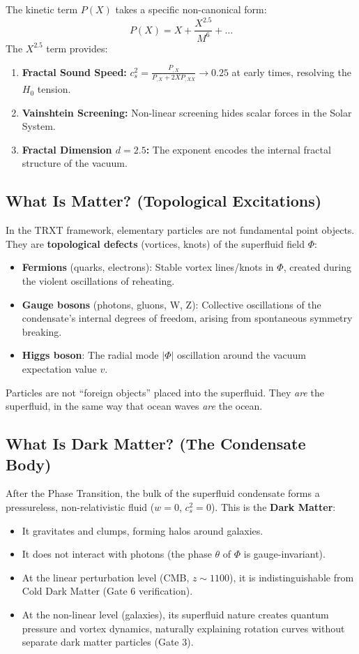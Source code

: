 \documentclass[a4paper,12pt]{article}
\begin{document}
The kinetic term $P(X)$ takes a specific non-canonical form:
\begin{equation}
    P(X) = X + \frac{X^{2.5}}{M^6} + \dots
\end{equation}
The $X^{2.5}$ term provides:
\begin{enumerate}
    \item \textbf{Fractal Sound Speed:} $c_s^2 = \frac{P_{,X}}{P_{,X} + 2X P_{,XX}} \to 0.25$ at early times, resolving the $H_0$ tension.
    \item \textbf{Vainshtein Screening:} Non-linear screening hides scalar forces in the Solar System.
    \item \textbf{Fractal Dimension $d = 2.5$:} The exponent encodes the internal fractal structure of the vacuum.
\end{enumerate}

\subsection{What Is Matter? (Topological Excitations)}
In the TRXT framework, elementary particles are not fundamental point objects. They are \textbf{topological defects} (vortices, knots) of the superfluid field $\Phi$:
\begin{itemize}
    \item \textbf{Fermions} (quarks, electrons): Stable vortex lines/knots in $\Phi$, created during the violent oscillations of reheating.
    \item \textbf{Gauge bosons} (photons, gluons, W, Z): Collective oscillations of the condensate's internal degrees of freedom, arising from spontaneous symmetry breaking.
    \item \textbf{Higgs boson}: The radial mode $|\Phi|$ oscillation around the vacuum expectation value $v$.
\end{itemize}
Particles are not ``foreign objects'' placed into the superfluid. They \textit{are} the superfluid, in the same way that ocean waves \textit{are} the ocean.

\subsection{What Is Dark Matter? (The Condensate Body)}
After the Phase Transition, the bulk of the superfluid condensate forms a pressureless, non-relativistic fluid ($w = 0$, $c_s^2 = 0$). This is the \textbf{Dark Matter}:
\begin{itemize}
    \item It gravitates and clumps, forming halos around galaxies.
    \item It does not interact with photons (the phase $\theta$ of $\Phi$ is gauge-invariant).
    \item At the linear perturbation level (CMB, $z \sim 1100$), it is indistinguishable from Cold Dark Matter (Gate 6 verification).
    \item At the non-linear level (galaxies), its superfluid nature creates quantum pressure and vortex dynamics, naturally explaining rotation curves without separate dark matter particles (Gate 3).
\end{itemize}
\end{document}
